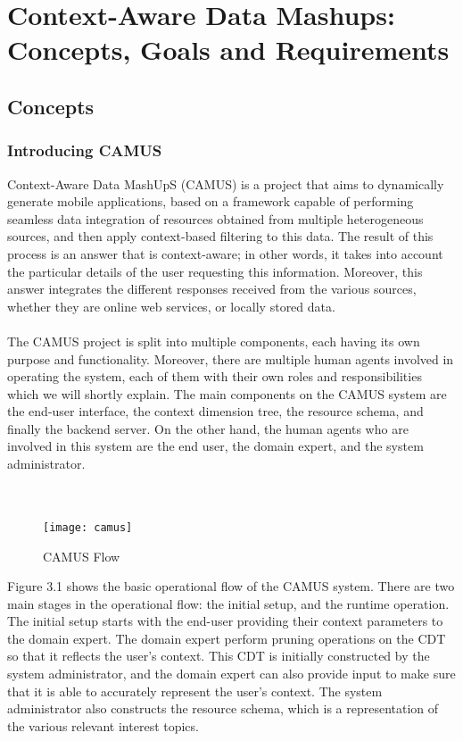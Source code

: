 \chapter{Context-Aware Data Mashups: Concepts, Goals and Requirements}
\label{capitolo3}
\thispagestyle{empty}

\section{Concepts}
\subsection{Introducing CAMUS}
Context-Aware Data MashUpS (CAMUS)\cite{camus} is a project that aims to dynamically generate mobile applications, based on a framework capable of performing seamless data integration of resources obtained from multiple heterogeneous sources, and then apply context-based filtering to this data. The result of this process is an answer that is context-aware; in other words, it takes into account the particular details of the user requesting this information. Moreover, this answer integrates the different responses received from the various sources, whether they are online web services, or locally stored data.\\\\
The CAMUS project is split into multiple components, each having its own purpose and functionality. Moreover, there are multiple human agents involved in operating the system, each of them with their own roles and responsibilities which we will shortly explain. The main components on the CAMUS system are the end-user interface, the context dimension tree, the resource schema, and finally the backend server. On the other hand, the human agents who are involved in this system are the end user, the domain expert, and the system administrator.\\\\\\
\begin{figure}[h]
\texttt{[image: camus]}
\caption{CAMUS Flow}
\end{figure}
Figure 3.1 shows the basic operational flow of the CAMUS system. There are two main stages in the operational flow: the initial setup, and the runtime operation. The initial setup starts with the end-user providing their context parameters to the domain expert. The domain expert perform pruning operations on the CDT so that it reflects the user's context. This CDT is initially constructed by the system administrator, and the domain expert can also provide input to make sure that it is able to accurately represent the user's context. The system administrator also constructs the resource schema, which is a representation of the various relevant interest topics.\\\\
